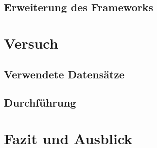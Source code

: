 \documentclass[12pt,titlepage]{beamer}
\begin{document}
	\subsection{Erweiterung des Frameworks}
	\begin{frame}
	\end{frame}
	\section{Versuch}
	\subsection{Verwendete Datensätze}
	\begin{frame}
	\end{frame}
	\subsection{Durchführung}
	\begin{frame}
	\end{frame}
	\section{Fazit und Ausblick}
	\begin{frame}
	\end{frame}
	
	
	
	
	
	
	
	

	


	
\end{document}
